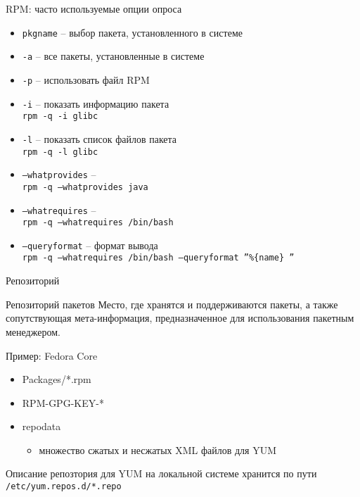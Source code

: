 \documentclass[ignorenonframetext, professionalfonts, hyperref={pdftex, unicode}]{beamer}
\begin{document}
\begin{frame}{RPM: часто используемые опции опроса}

	\begin{itemize}
		\item {\tt pkgname} -- выбор пакета, установленного в системе
		\item {\tt -a} -- все пакеты, установленные в системе
		\item {\tt -p} -- использовать файл RPM
	\end{itemize}


	\begin{itemize}
		\item {\tt -i} -- показать информацию пакета\\
			{\tt rpm -q -i glibc }
		\item {\tt -l} -- показать список файлов пакета \\
			{\tt rpm -q -l glibc }
		\item {\tt --whatprovides} -- \\
			{\tt rpm -q --whatprovides java}
		\item {\tt --whatrequires} -- \\
			{\tt rpm -q --whatrequires /bin/bash}
		\item {\tt --queryformat} -- формат вывода\\
			{\tt rpm -q --whatrequires /bin/bash --queryformat ''\%\{name\} ''}

	\end{itemize}

\end{frame}


\begin{frame}{Репозиторий}
	\begin{block}{Репозиторий пакетов}
		Место, где хранятся и поддерживаются пакеты, а также сопутствующая мета-информация, предназначенное для использования пакетным менеджером.
	\end{block}
	\begin{block}{Пример: Fedora Core}
		\begin{itemize}
			\item Packages/*.rpm
			\item RPM-GPG-KEY-*
			\item repodata
			\begin{itemize}
				\item множество сжатых и несжатых XML файлов для YUM
			\end{itemize}
		\end{itemize}

		Описание репозтория для YUM на локальной системе хранится по пути
		{\tt /etc/yum.repos.d/*.repo}
	\end{block}
		
\end{frame}
\end{document}
